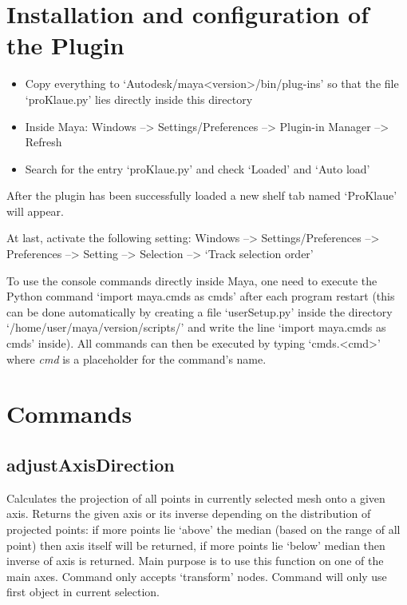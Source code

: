 \documentclass[letterpaper,10pt,english]{sphinxmanual}
\begin{document}
\chapter{Installation and configuration of the Plugin}
\label{index:installation-and-configuration-of-the-plugin}\begin{itemize}
\item {} 
Copy everything to `Autodesk/maya\textless{}version\textgreater{}/bin/plug-ins' so that the file `proKlaue.py' lies directly inside this directory

\item {} 
Inside Maya: Windows --\textgreater{} Settings/Preferences --\textgreater{} Plugin-in Manager --\textgreater{} Refresh

\item {} 
Search for the entry `proKlaue.py' and check `Loaded' and `Auto load'

\end{itemize}

After the plugin has been successfully loaded a new shelf tab named `ProKlaue' will appear.

At last, activate the following setting: Windows --\textgreater{} Settings/Preferences --\textgreater{} Preferences --\textgreater{} Setting --\textgreater{} Selection --\textgreater{} `Track selection order'

To use the console commands directly inside Maya, one need to execute the Python command `import maya.cmds as cmds' after each program restart (this can be done automatically by creating a file `userSetup.py' inside the directory `/home/user/maya/version/scripts/' and write the line `import maya.cmds as cmds' inside). All commands can then be executed by typing `cmds.\textless{}cmd\textgreater{}' where \emph{cmd} is a placeholder for the command's name.


\chapter{Commands}
\label{index:commands}\label{index:id1}

\section{adjustAxisDirection}
\label{pk_src.adjustAxisDirection::doc}\label{pk_src.adjustAxisDirection:adjustaxisdirection}\label{pk_src.adjustAxisDirection:id1}
{\hyperref[index:commands]{}}
\label{pk_src.adjustAxisDirection:module-pk_src.adjustAxisDirection}
Calculates the projection of all points in currently selected mesh onto a given axis. Returns the given axis or its inverse depending on the distribution of projected points: if more points lie `above' the median (based on the range of all point) then axis itself will be returned, if more points lie `below' median then inverse of axis is returned. Main purpose is to use this function on one of the main axes.
Command only accepts `transform' nodes. Command will only use first object in current selection.
\end{document}
